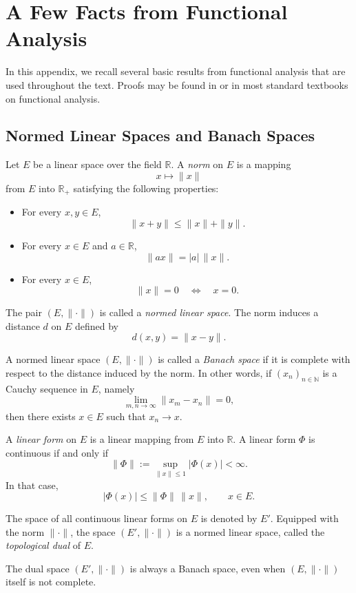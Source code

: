 \documentclass[../Main.tex]{subfiles}
\begin{document}
\chapter{A Few Facts from Functional Analysis}
\label{apen:Functional_Analysis}

In this appendix, we recall several basic results from functional analysis that are used throughout the text. Proofs may be found in \cite{realanalysis} or in most standard textbooks on functional analysis.

\section{Normed Linear Spaces and Banach Spaces}

Let $E$ be a linear space over the field $\mathbb{R}$. A \emph{norm} on $E$ is a mapping
\[
x \mapsto \|x\|
\]
from $E$ into $\mathbb{R}_+$ satisfying the following properties:

\begin{itemize}
    \item For every $x,y \in E$,
    \[
    \|x+y\| \leq \|x\|+\|y\|.
    \]
    \item For every $x \in E$ and $a \in \mathbb{R}$,
    \[
    \|ax\| = |a|\,\|x\|.
    \]
    \item For every $x \in E$,
    \[
    \|x\|=0 \quad \Longleftrightarrow \quad x=0.
    \]
\end{itemize}

The pair $(E,\|\cdot\|)$ is called a \emph{normed linear space}. The norm induces a distance $d$ on $E$ defined by
\[
d(x,y)=\|x-y\|.
\]

A normed linear space $(E,\|\cdot\|)$ is called a \emph{Banach space} if it is complete with respect to the distance induced by the norm. In other words, if $(x_n)_{n\in\mathbb{N}}$ is a Cauchy sequence in $E$, namely
\[
\lim_{m,n\to\infty}\|x_m-x_n\|=0,
\]
then there exists $x\in E$ such that $x_n \to x$.

A \emph{linear form} on $E$ is a linear mapping from $E$ into $\mathbb{R}$. A linear form $\Phi$ is continuous if and only if
\[
\|\Phi\|:=\sup_{\|x\|\leq 1} |\Phi(x)|<\infty.
\]
In that case,
\[
|\Phi(x)|\leq \|\Phi\|\,\|x\|, \qquad x\in E.
\]

The space of all continuous linear forms on $E$ is denoted by $E'$. Equipped with the norm $\|\cdot\|$, the space $(E',\|\cdot\|)$ is a normed linear space, called the \emph{topological dual} of $E$.

The dual space $(E',\|\cdot\|)$ is always a Banach space, even when $(E,\|\cdot\|)$ itself is not complete.
\end{document}
